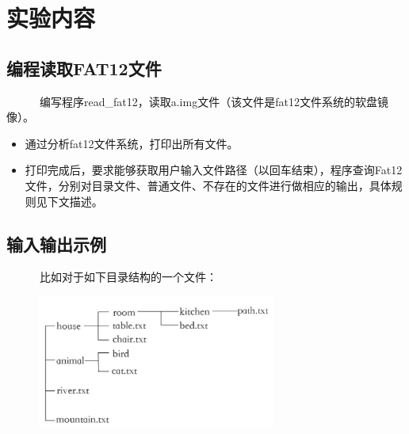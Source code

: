 \documentclass[a4paper]{article}
\title{\Huge \heiti{操作系统实验（二）}}
\author{\lishu{南京大学软件学院}}
\date{\normalsize 2015.4}
\begin{document}
\maketitle

\renewcommand{\abstractname}{实验重点}

\begin{abstract}
本次作业重点：熟悉掌握Fat12文件系统，$gcc+nasm$联合编译实践以及了解实模式与保护模式的基本内容。
\end{abstract}

\section{实验内容}
\subsection{编程读取FAT12文件}
~~~~~~编写程序read\_fat12，读取a.img文件（该文件是fat12文件系统的软盘镜像）。
\begin{itemize}
	\item 通过分析fat12文件系统，打印出所有文件。
	\item 打印完成后，要求能够获取用户输入文件路径（以回车结束），程序查询Fat12文件，分别对目录文件、普通文件、不存在的文件进行做相应的输出，具体规则见下文描述。
\end{itemize}

\subsection{输入输出示例}
~~~~~~比如对于如下目录结构的一个文件：
\begin{figure}[htbp]
\centering
\includegraphics[width=0.7\textwidth]{path.png}
\end{figure}
\end{document}
